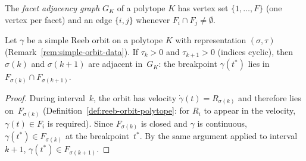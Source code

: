 %
%

\begin{definition}\label{def:adjacency-graph}
The \emph{facet adjacency graph} $G_K$ of a polytope $K$ has
vertex set $\{1, \ldots, F\}$ (one vertex per facet) and an edge
$\{i, j\}$ whenever $F_i \cap F_j \neq \emptyset$.
\end{definition}

\begin{lemma}\label{lem:adjacency-constraint}
Let $\gamma$ be a simple Reeb orbit on a polytope $K$ with
representation $(\sigma, \tau)$
(Remark~\ref{rem:simple-orbit-data}).
If $\tau_k > 0$ and $\tau_{k+1} > 0$ (indices cyclic), then
$\sigma(k)$ and $\sigma(k+1)$ are adjacent in~$G_K$:
the breakpoint $\gamma(t^*)$ lies in
$F_{\sigma(k)} \cap F_{\sigma(k+1)}$.
\end{lemma}

\begin{proof}
During interval~$k$, the orbit has velocity
$\dot{\gamma}(t) = R_{\sigma(k)}$ and therefore lies on~$F_{\sigma(k)}$
(Definition~\ref{def:reeb-orbit-polytope}: for $R_i$ to appear
in the velocity, $\gamma(t) \in F_i$ is required).
Since $F_{\sigma(k)}$ is closed and $\gamma$ is continuous,
$\gamma(t^*) \in F_{\sigma(k)}$ at the breakpoint~$t^*$.
By the same argument applied to interval~$k{+}1$,
$\gamma(t^*) \in F_{\sigma(k+1)}$.
\end{proof}

